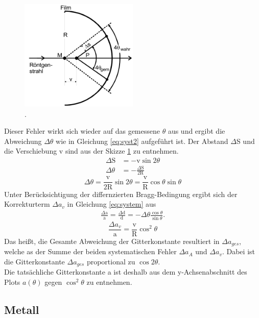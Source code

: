 \begin{figure}
\centering
	\includegraphics[width = 0.5\textwidth]{Abbildungen/Syst2.png}
	\caption{\cite{Anleitung}.}
	\label{fig:sys2}
\end{figure}
Dieser Fehler wirkt sich wieder auf das gemessene $\theta$ aus und ergibt die Abweichung $\Delta \theta$ wie in Gleichung \ref{eq:syst2} aufgeführt ist.
Der Abstand $\Delta$S und die Verschiebung v sind aus der Skizze \ref{fig:sys2} zu entnehmen.
\begin{align*}
\Delta \text{S} &  = -\text{v} \sin{2 \theta} \\
\Delta \theta & = -\frac{\Delta \text{S}}{2\text{R}}
\end{align*}
\begin{equation}
\Delta \theta = \frac{\text{v}}{2\text{R}}\sin{2\theta} = \frac{\text{v}}{\text{R}}\cos{\theta}\sin{\theta}
\label{eq:syst2}
\end{equation}
Unter Berücksichtigung der differnzierten Bragg-Bedingung ergibt sich der Korrekturterm $\Delta a_v$ in Gleichung \ref{eq:system} aus
\begin{align*}
\frac{\Delta \text{a}}{\text{a}} = \frac{\Delta \text{d}}{\text{d}} = -\Delta \theta \frac{\cos{\theta}}{\sin{\theta}}.
\end{align*}
\begin{equation}
\frac{\Delta a_v}{\text{a}} = \frac{\text{v}}{\text{R}}\cos^2{\theta}
\label{eq:system}
\end{equation}
Das heißt, die Gesamte Abweichung der Gitterkonstante resultiert in $\Delta a_{ges}$, welche as der Summe der beiden systematischen Fehler $\Delta a_A$ und $\Delta a_v$. 
Dabei ist die Gitterkonstante $\Delta a_{ges}$ proportional zu $\cos2{\theta}$.\\
Die tatsächliche Gitterkonstante a ist deshalb aus dem y-Achsenabschnitt des Plots $a(\theta)$ gegen $\cos^2{\theta}$ zu entnehmen.

\subsection{Metall}